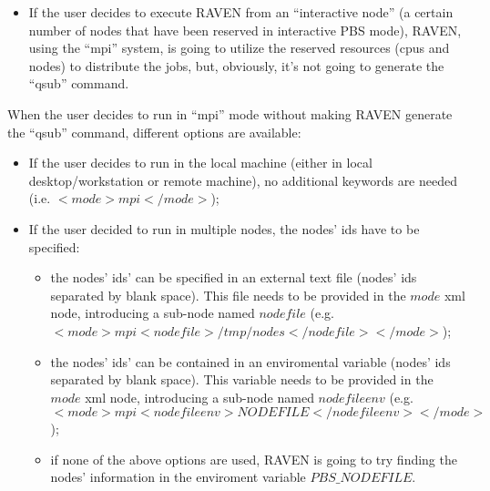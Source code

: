 \begin{itemize}
\begin{itemize}
\begin{itemize}
           \item If the user decides to execute RAVEN from an ``interactive node'' (a certain number of nodes that have been reserved in interactive PBS mode), RAVEN, using the ``mpi'' system, is going to utilize the reserved resources (cpus and nodes) to distribute the jobs, but, obviously, it's not going to generate the ``qsub'' command. 
         \end{itemize}
     When the user decides to run in ``mpi'' mode without making RAVEN generate the ``qsub'' command, different options are available:
      \begin{itemize}         
           \item If the user decides to run in the local machine (either in local desktop/workstation or remote machine), no additional keywords are needed (i.e. $<mode>mpi</mode>$); 
           \item If the user decided to run in multiple nodes, the nodes' ids have to be specified:
           \begin{itemize} 
              \item the nodes' ids' can be specified in an external text file (nodes' ids separated by blank space). This file needs to be provided in the $mode$ xml node, introducing a sub-node named $nodefile$ (e.g. $<mode>mpi<nodefile>/tmp/nodes</nodefile></mode>$);
              \item the nodes' ids' can be contained in an enviromental variable (nodes' ids separated by blank space). This variable needs to be provided in the $mode$ xml node, introducing a sub-node named $nodefileenv$ (e.g. $<mode>mpi<nodefileenv>NODEFILE</nodefileenv></mode>$);
                \item if none of the above options are used, RAVEN is going to try finding the nodes' information in the enviroment variable $PBS\_NODEFILE$.
           \end{itemize}
         \end{itemize}    
   \end{itemize}


\end{itemize}
